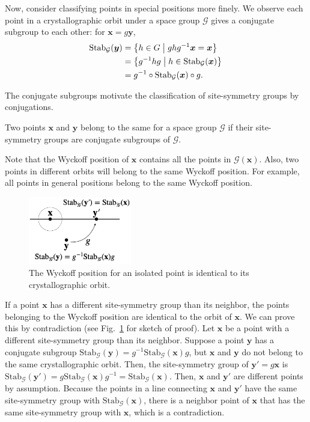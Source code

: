 Now, consider classifying points in special positions more finely.
We observe each point in a crystallographic orbit under a space group $\mathcal{G}$ gives a conjugate subgroup to each other: for $\bm{x} = g \bm{y}$,
\begin{align}
  \mathrm{Stab}_{\mathcal{G}}(\bm{y})
    &= \left\{  h \in G  \mathrel{}\middle|\mathrel{}  ghg^{-1}\bm{x} = \bm{x}  \right\} \nonumber \\
    &= \left\{  g^{-1} h g  \mathrel{}\middle|\mathrel{}  h \in \mathrm{Stab}_{\mathcal{G}}(\bm{x})  \right\} \nonumber \\
    &= g^{-1} \circ \mathrm{Stab}_{\mathcal{G}}(\bm{x}) \circ g.
\end{align}

The conjugate subgroups motivate the classification of site-symmetry groups by conjugations.
\begin{screen}
  \begin{defn}
    Two points $\bm{x}$ and $\bm{y}$ belong to the same  for a space group $\mathcal{G}$ if their site-symmetry groups are conjugate subgroups of $\mathcal{G}$.
  \end{defn}
\end{screen}

Note that the Wyckoff position of $\bm{x}$ contains all the points in $\mathcal{G}(\bm{x})$.
Also, two points in different orbits will belong to the same Wyckoff position.
For example, all points in general positions belong to the same Wyckoff position.

\begin{figure}[tb]
  \centering
  \includegraphics[width=0.4\textwidth]{figure/fig_wyckoff.png}
  \caption{The Wyckoff position for an isolated point is identical to its crystallographic orbit.}
  \label{fig:isolated-wyckoff-position}
\end{figure}

If a point $\bm{x}$ has a different site-symmetry group than its neighbor, the points belonging to the Wyckoff position are identical to the orbit of $\bm{x}$.
We can prove this by contradiction (see Fig.~\ref{fig:isolated-wyckoff-position} for sketch of proof).
Let $\bm{x}$ be a point with a different site-symmetry group than its neighbor.
Suppose a point $\bm{y}$ has a conjugate subgroup $\mathrm{Stab}_{\mathcal{G}}(\bm{y}) = g^{-1}  \mathrm{Stab}_{\mathcal{G}}(\bm{x}) g$, but $\bm{x}$ and $\bm{y}$ do not belong to the same crystallographic orbit.
Then, the site-symmetry group of $\bm{y}' = g\bm{x}$ is $\mathrm{Stab}_{\mathcal{G}}(\bm{y}') = g \mathrm{Stab}_{\mathcal{G}}(\bm{x}) g^{-1} = \mathrm{Stab}_{\mathcal{G}}(\bm{x})$.
Then, $\bm{x}$ and $\bm{y}'$ are different points by assumption.
Because the points in a line connecting $\bm{x}$ and $\bm{y}'$ have the same site-symmetry group with $\mathrm{Stab}_{\mathcal{G}}(\bm{x})$, there is a neighbor point of $\bm{x}$ that has the same site-symmetry group with $\bm{x}$, which is a contradiction.

